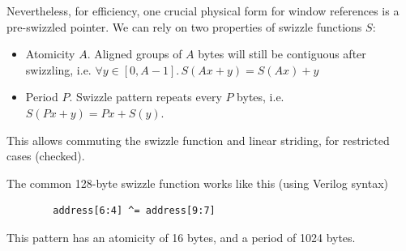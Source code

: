 Nevertheless, for efficiency, one crucial physical form for window references is a pre-swizzled pointer.
We can rely on two properties of swizzle functions $S$:
\begin{itemize}
  \item Atomicity $A$. Aligned groups of $A$ bytes will still be contiguous after swizzling, i.e. $\forall y \in [0, A-1].\, S(Ax + y) = S(Ax) + y$
  \item Period $P$. Swizzle pattern repeats every $P$ bytes, i.e. $S(Px + y) = Px + S(y)$.
\end{itemize}
This allows commuting the swizzle function and linear striding, for restricted cases (checked).

The common 128-byte swizzle function works like this (using Verilog syntax)
\begin{verbatim}
        address[6:4] ^= address[9:7]
\end{verbatim}
This pattern has an atomicity of 16 bytes, and a period of 1024 bytes.
